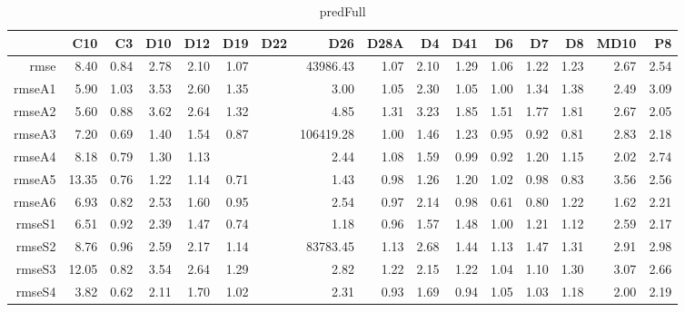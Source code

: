 \begin{table}[H]
\centering
\begin{tabular}{rrrrrrrrrrrrrrrr}
  \hline
 & C10 & C3 & D10 & D12 & D19 & D22 & D26 & D28A & D4 & D41 & D6 & D7 & D8 & MD10 & P8 \\ 
  \hline
rmse & 8.40 & 0.84 & 2.78 & 2.10 & 1.07 &  & 43986.43 & 1.07 & 2.10 & 1.29 & 1.06 & 1.22 & 1.23 & 2.67 & 2.54 \\ 
  rmseA1 & 5.90 & 1.03 & 3.53 & 2.60 & 1.35 &  & 3.00 & 1.05 & 2.30 & 1.05 & 1.00 & 1.34 & 1.38 & 2.49 & 3.09 \\ 
  rmseA2 & 5.60 & 0.88 & 3.62 & 2.64 & 1.32 &  & 4.85 & 1.31 & 3.23 & 1.85 & 1.51 & 1.77 & 1.81 & 2.67 & 2.05 \\ 
  rmseA3 & 7.20 & 0.69 & 1.40 & 1.54 & 0.87 &  & 106419.28 & 1.00 & 1.46 & 1.23 & 0.95 & 0.92 & 0.81 & 2.83 & 2.18 \\ 
  rmseA4 & 8.18 & 0.79 & 1.30 & 1.13 &  &  & 2.44 & 1.08 & 1.59 & 0.99 & 0.92 & 1.20 & 1.15 & 2.02 & 2.74 \\ 
  rmseA5 & 13.35 & 0.76 & 1.22 & 1.14 & 0.71 &  & 1.43 & 0.98 & 1.26 & 1.20 & 1.02 & 0.98 & 0.83 & 3.56 & 2.56 \\ 
  rmseA6 & 6.93 & 0.82 & 2.53 & 1.60 & 0.95 &  & 2.54 & 0.97 & 2.14 & 0.98 & 0.61 & 0.80 & 1.22 & 1.62 & 2.21 \\ 
  rmseS1 & 6.51 & 0.92 & 2.39 & 1.47 & 0.74 &  & 1.18 & 0.96 & 1.57 & 1.48 & 1.00 & 1.21 & 1.12 & 2.59 & 2.17 \\ 
  rmseS2 & 8.76 & 0.96 & 2.59 & 2.17 & 1.14 &  & 83783.45 & 1.13 & 2.68 & 1.44 & 1.13 & 1.47 & 1.31 & 2.91 & 2.98 \\ 
  rmseS3 & 12.05 & 0.82 & 3.54 & 2.64 & 1.29 &  & 2.82 & 1.22 & 2.15 & 1.22 & 1.04 & 1.10 & 1.30 & 3.07 & 2.66 \\ 
  rmseS4 & 3.82 & 0.62 & 2.11 & 1.70 & 1.02 &  & 2.31 & 0.93 & 1.69 & 0.94 & 1.05 & 1.03 & 1.18 & 2.00 & 2.19 \\ 
   \hline
\end{tabular}
\caption{predFull} 
\end{table}
